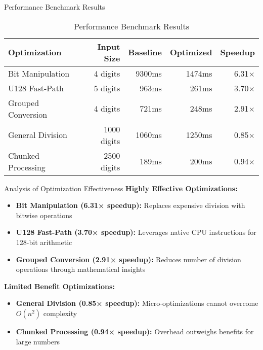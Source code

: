 \documentclass[10pt]{beamer}
\begin{document}
\begin{frame}{Performance Benchmark Results}
\begin{table}[H]
\centering
\caption{Performance Benchmark Results}
\label{tab:performance}
\small
\begin{tabular}{lrrrr}
\toprule
\textbf{Optimization} & \textbf{Input Size} & \textbf{Baseline} & \textbf{Optimized} & \textbf{Speedup} \\
\midrule
Bit Manipulation & 4 digits & 9300ms & 1474ms & 6.31× \\
U128 Fast-Path & 5 digits & 963ms & 261ms & 3.70× \\
Grouped Conversion & 4 digits & 721ms & 248ms & 2.91× \\
General Division & 1000 digits & 1060ms & 1250ms & 0.85× \\
Chunked Processing & 2500 digits & 189ms & 200ms & 0.94× \\
\bottomrule
\end{tabular}
\end{table}
\end{frame}

\begin{frame}{Analysis of Optimization Effectiveness}
\textbf{Highly Effective Optimizations:}
\begin{itemize}
\item \textbf{Bit Manipulation (6.31× speedup):} Replaces expensive division with bitwise operations
\item \textbf{U128 Fast-Path (3.70× speedup):} Leverages native CPU instructions for 128-bit arithmetic
\item \textbf{Grouped Conversion (2.91× speedup):} Reduces number of division operations through mathematical insights
\end{itemize}

\vspace{0.3cm}
\textbf{Limited Benefit Optimizations:}
\begin{itemize}
\item \textbf{General Division (0.85× speedup):} Micro-optimizations cannot overcome $O(n^2)$ complexity
\item \textbf{Chunked Processing (0.94× speedup):} Overhead outweighs benefits for large numbers
\end{itemize}
\end{frame}
\end{document}
